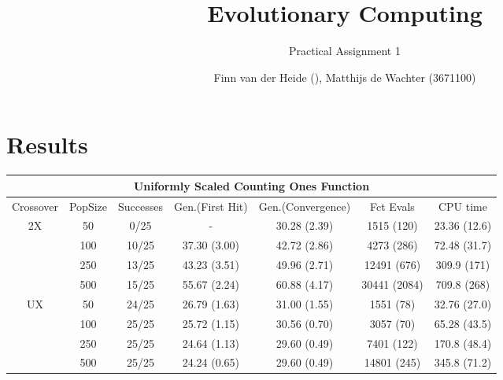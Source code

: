 \documentclass[]{scrartcl}
\title{Evolutionary Computing}
\subtitle{Practical Assignment 1}
\author{Finn van der Heide (), Matthijs de Wachter (3671100)}
\begin{document}
\maketitle

\section{Results}

\newpage

\begin{table}
	\small
	\tabcolsep=0.09cm
	\begin{tabular}{|c|c|c|c|c|c|c|}
		\hline
		\multicolumn{7}{|c|}{Uniformly Scaled Counting Ones Function}                                                   \\ \hline
		Crossover           & PopSize & Successes & Gen.(First Hit) & Gen.(Convergence) & Fct Evals    & CPU time     \\ \hline
		\multirow{4}{*}{2X} & 50      & 0/25      & -                & 30.28 (2.39)       & 1515 (120)   & 23.36 (12.6) \\ \cline{2-7} 
		& 100     & 10/25     & 37.30 (3.00)     & 42.72 (2.86)       & 4273 (286)   & 72.48 (31.7) \\ \cline{2-7} 
		& 250     & 13/25     & 43.23 (3.51)     & 49.96 (2.71)       & 12491 (676)  & 309.9 (171)  \\ \cline{2-7} 
		& 500     & 15/25     & 55.67 (2.24)     & 60.88 (4.17)       & 30441 (2084) & 709.8 (268)  \\ \hline \hline
		\multirow{4}{*}{UX} & 50      & 24/25     & 26.79 (1.63)     & 31.00 (1.55)       & 1551 (78)    & 32.76 (27.0) \\ \cline{2-7} 
		& 100     & 25/25     & 25.72 (1.15)     & 30.56 (0.70)       & 3057 (70)    & 65.28 (43.5) \\ \cline{2-7} 
		& 250     & 25/25     & 24.64 (1.13)     & 29.60 (0.49)       & 7401 (122)   & 170.8 (48.4) \\ \cline{2-7} 
		& 500     & 25/25     & 24.24 (0.65)     & 29.60 (0.49)       & 14801 (245)  & 345.8 (71.2) \\ \hline
	\end{tabular}
\end{table}
\end{document}

